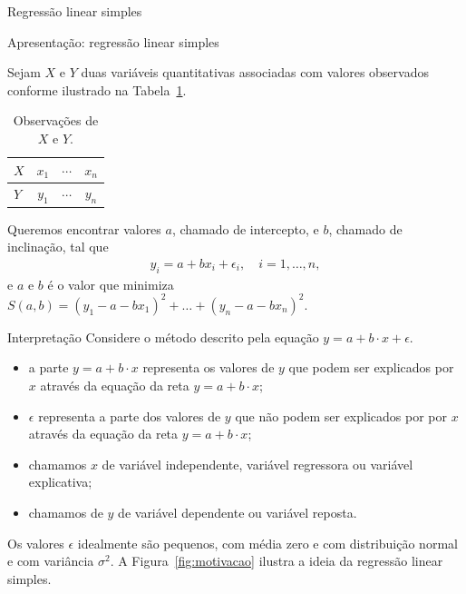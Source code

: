 \documentclass[8pt]{beamer}
\begin{document}
\begin{frame}{Regressão linear simples}

\footnotesize	
	\begin{block}{Apresentação: regressão linear simples}
		
		Sejam $X$ e $Y$ duas variáveis quantitativas associadas com valores observados conforme ilustrado na Tabela~\ref{tab:motivacao}.
		\begin{table}[htbp]
			\centering
			\caption{Observações de $X$ e $Y$.}
			\label{tab:motivacao}
			\begin{tabular}{l|ccc}
				\toprule[0.05cm]
					$X$ & $x_1$ & $\cdots$ &  $x_n$\\
					\midrule[0.05cm]
					$Y$ & $y_1$ & $\cdots$ &  $y_n$\\
				\bottomrule[0.05cm]
			\end{tabular}
		\end{table}
	
	Queremos encontrar valores $a$, chamado de intercepto, e $b$, chamado de inclinação, tal que 
	\begin{align*}
		y_i = a + b x_i + \epsilon_i, \quad i =1, \dots,n,
	\end{align*}
	e $a$ e $b$ é o valor que minimiza $S(a,b) = (y_1 - a - b x_1)^2+\dots + (y_n - a - b x_n)^2$.
	\end{block}

\begin{block}{Interpretação}
	Considere o método descrito pela equação $y = a + b \cdot x + \epsilon$.
	\begin{itemize}
		\item a parte $y = a + b \cdot x$ representa os valores de $y$ que podem ser  explicados por $x$ através da equação da reta $y = a + b \cdot x$;
		\item $\epsilon$ representa a parte dos valores de $y$ que não podem ser explicados por por $x$ através da equação da reta $y = a + b \cdot x$;
		\item chamamos $x$ de variável independente,  variável regressora ou variável explicativa;
		\item  chamamos de $y$ de variável dependente ou variável reposta.
	\end{itemize}
Os valores $\epsilon$ idealmente são pequenos, com média zero e com distribuição normal e com variância $\sigma^2$. A Figura~\ref{fig:motivacao} ilustra a ideia da regressão linear simples.
\end{block}
\normalsize

\end{frame}
\end{document}

